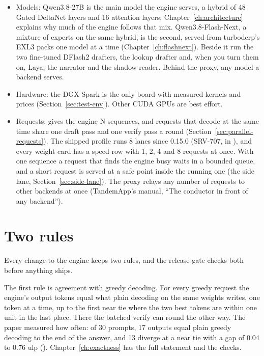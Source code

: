 \begin{itemize}
\item Models: Qwen3.8-27B is the main model the engine serves, a hybrid of 48 Gated DeltaNet layers and 16 attention layers; Chapter~\ref{ch:architecture} explains why much of the engine follows that mix. Qwen3.8-Flash-Next, a mixture of experts on the same hybrid, is the second, served from turboderp's EXL3 packs one model at a time (Chapter~\ref{ch:flashnext}). Beside it run the two fine-tuned DFlash2 drafters, the lookup drafter and, when you turn them on, Laya, the narrator and the shadow reader. Behind the proxy, any model a backend serves.
\item Hardware: the DGX Spark is the only board with measured kernels and prices (Section~\ref{sec:test-env}). Other CUDA GPUs are best effort.
\item Requests:  gives the engine N sequences, and requests that decode at the same time share one draft pass and one verify pass a round (Section~\ref{sec:parallel-requests}). The shipped profile runs 8 lanes since 0.15.0 (SRV-707,  in ), and every weight card has a speed row with 1, 2, 4 and 8 requests at once. With one sequence a request that finds the engine busy waits in a bounded queue, and a short request is served at a safe point inside the running one (the side lane, Section~\ref{sec:side-lane}). The proxy relays any number of requests to other backends at once (TandemApp's manual, \enquote{The conductor in front of any backend}).
\end{itemize}

\section{Two rules}

Every change to the engine keeps two rules, and the release gate checks both before anything ships.

The first rule is agreement with greedy decoding. For every greedy request the engine's output tokens equal what plain decoding on the same weights writes, one token at a time, up to the first near tie where the two best tokens are within one unit in the last place. There the batched verify can round the other way. The paper measured how often: of 30 prompts, 17 outputs equal plain greedy decoding to the end of the answer, and 13 diverge at a near tie with a gap of 0.04 to 0.76 ulp (\measured). Chapter~\ref{ch:exactness} has the full statement and the checks.

